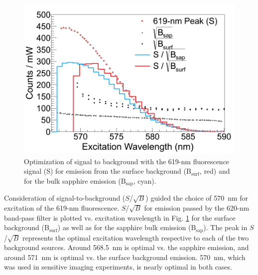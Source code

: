 \begin{figure} %
        \centering
                \includegraphics[width=.7\textwidth]{figures/S_to_B_both.png}
                \caption{Optimization of signal to background with the 619-nm fluorescence signal (S) for emission from the surface background (B$_{\text{surf}}$, red) and for the bulk sapphire emission (B$_{\text{sap}}$, cyan).}
        \label{fig:StoB}
\end{figure}

Consideration of signal-to-background ($S$/$\sqrt{B}$) guided the choice of 570~nm for excitation of the 619-nm fluorescence.  $S$/$\sqrt{B}$ for emission passed by the 620-nm band-pass filter is plotted vs. excitation wavelength in Fig. \ref{fig:StoB} for the surface background (B$_{\text{surf}}$) as well as for the sapphire bulk emission (B$_{\text{sap}}$).  The peak in $S$/$\sqrt{B}$ represents the optimal excitation wavelength respective to each of the two background sources.  Around 568.5~nm is optimal vs. the sapphire emission, and around 571~nm is optimal vs. the surface background emission. 570~nm, which was used in sensitive imaging experiments, is nearly optimal in both cases.




